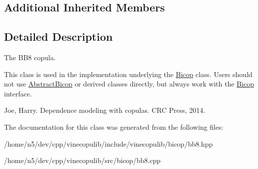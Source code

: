 \subsection*{Additional Inherited Members}


\subsection{Detailed Description}
The B\+B8 copula. 

This class is used in the implementation underlying the \hyperlink{classvinecopulib_1_1_bicop}{Bicop} class. Users should not use \hyperlink{classvinecopulib_1_1_abstract_bicop}{Abstract\+Bicop} or derived classes directly, but always work with the \hyperlink{classvinecopulib_1_1_bicop}{Bicop} interface.

Joe, Harry. Dependence modeling with copulas. C\+RC Press, 2014. 

The documentation for this class was generated from the following files\+:\begin{DoxyCompactItemize}
\item 
/home/n5/dev/cpp/vinecopulib/include/vinecopulib/bicop/bb8.\+hpp\item 
/home/n5/dev/cpp/vinecopulib/src/bicop/bb8.\+cpp\end{DoxyCompactItemize}
